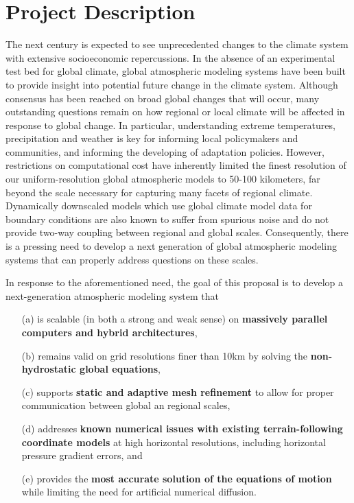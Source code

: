 \documentclass[11pt]{article}
\begin{document}
\appendix

\addtocounter{section}{3}
 
\section{Project Description}


The next century is expected to see unprecedented changes to the climate system with extensive socioeconomic repercussions.  In the absence of an experimental test bed for global climate, global atmospheric modeling systems have been built to provide insight into potential future change in the climate system.  Although consensus has been reached on broad global changes that will occur, many outstanding questions remain on how regional or local climate will be affected in response to global change.  In particular, understanding extreme temperatures, precipitation and weather is key for informing local policymakers and communities, and informing the developing of adaptation policies.  However, restrictions on computational cost have inherently limited the finest resolution of our uniform-resolution global atmospheric models to 50-100 kilometers, far beyond the scale necessary for capturing many facets of regional climate.  Dynamically downscaled models which use global climate model data for boundary conditions are also known to suffer from spurious noise and do not provide two-way coupling between regional and global scales.  Consequently, there is a pressing need to develop a next generation of global atmospheric modeling systems that can properly address questions on these scales.

In response to the aforementioned need, the goal of this proposal is to develop a next-generation atmospheric modeling system that
\vspace{-0.4cm}
\begin{enumerate}
\item[(a)] is scalable (in both a strong and weak sense) on \textbf{massively parallel computers and hybrid architectures},
\item[(b)] remains valid on grid resolutions finer than 10km by solving the \textbf{non-hydrostatic global equations},
\item[(c)] supports \textbf{static and adaptive mesh refinement} to allow for proper communication between global an regional scales,
\item[(d)] addresses \textbf{known numerical issues with existing terrain-following coordinate models} at high horizontal resolutions, including horizontal pressure gradient errors, and
\item[(e)] provides the \textbf{most accurate solution of the equations of motion} while limiting the need for artificial numerical diffusion. 
\end{enumerate}
\end{document}
